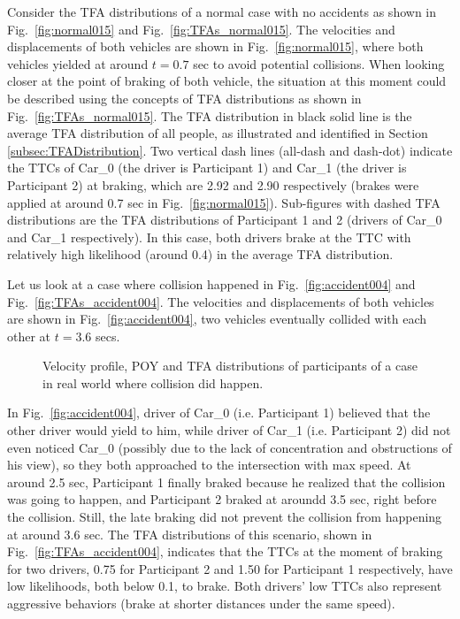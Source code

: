 Consider the TFA distributions of a normal case with no accidents as shown in Fig.~\ref{fig:normal015} and Fig.~\ref{fig:TFAs_normal015}. The velocities and displacements of both vehicles are shown in Fig.~\ref{fig:normal015}, where both vehicles yielded at around $t=0.7$ sec to avoid potential collisions. When looking closer at the point of braking of both vehicle, the situation at this moment could be described using the concepts of TFA distributions as shown in Fig.~\ref{fig:TFAs_normal015}. The TFA distribution in black solid line is the average TFA distribution of all people, as illustrated and identified in Section \ref{subsec:TFADistribution}. Two vertical dash lines (all-dash and dash-dot) indicate the TTCs of Car\_0 (the driver is Participant 1) and Car\_1 (the driver is Participant 2) at braking, which are 2.92 and 2.90 respectively (brakes were applied at around 0.7 sec in Fig.~\ref{fig:normal015}). Sub-figures with dashed TFA distributions are the TFA distributions of Participant 1 and 2 (drivers of Car\_0 and Car\_1 respectively). In this case, both drivers brake at the TTC with relatively high likelihood (around 0.4) in the average TFA distribution.

Let us look at a case where collision happened in Fig.~\ref{fig:accident004} and Fig.~\ref{fig:TFAs_accident004}. The velocities and displacements of both vehicles are shown in Fig.~\ref{fig:accident004}, two vehicles eventually collided with each other at $t=3.6$ secs. 

\begin{figure}[htbp!]
    \centering
    \hfill
    \hfill
    \caption{Velocity profile, POY and TFA distributions of participants of a case in real world where collision did happen.}
\label{fig:case_accident} 
\end{figure}


In Fig.~\ref{fig:accident004}, driver of Car\_0 (i.e. Participant 1) believed that the other driver would yield to him, while driver of Car\_1 (i.e. Participant 2) did not even noticed Car\_0 (possibly due to the lack of concentration and obstructions of his view), so they both approached to the intersection with max speed. At around 2.5 sec, Participant 1 finally braked because he realized that the collision was going to happen, and Participant 2 braked at aroundd 3.5 sec, right before the collision. Still, the late braking did not prevent the collision from happening at around 3.6 sec. The TFA distributions of this scenario, shown in Fig.~\ref{fig:TFAs_accident004}, indicates that the TTCs at the moment of braking for two drivers, 0.75 for Participant 2 and 1.50 for Participant 1 respectively, have low likelihoods, both below 0.1, to brake. Both drivers' low TTCs also represent aggressive behaviors (brake at shorter distances under the same speed).

